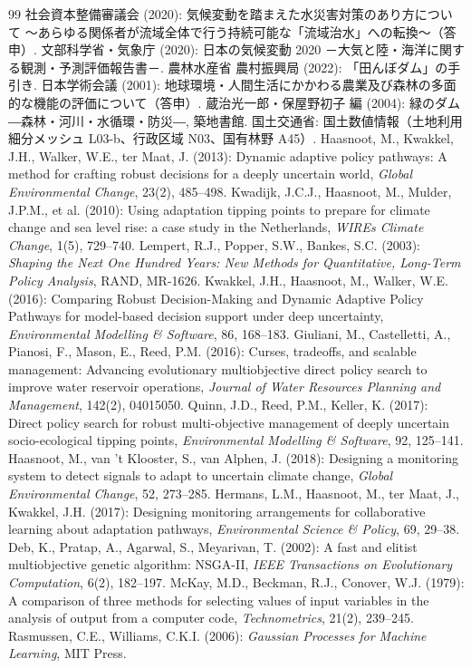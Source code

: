 \documentclass[a4paper,10pt]{ltjsarticle}
\begin{document}
\begin{thebibliography}{99}
 社会資本整備審議会 (2020): 気候変動を踏まえた水災害対策のあり方について ～あらゆる関係者が流域全体で行う持続可能な「流域治水」への転換～（答申）.
 文部科学省・気象庁 (2020): 日本の気候変動 2020 －大気と陸・海洋に関する観測・予測評価報告書－.
 農林水産省 農村振興局 (2022): 「田んぼダム」の手引き.
 日本学術会議 (2001): 地球環境・人間生活にかかわる農業及び森林の多面的な機能の評価について（答申）.
 蔵治光一郎・保屋野初子 編 (2004): 緑のダム ―森林・河川・水循環・防災―, 築地書館.
 国土交通省: 国土数値情報（土地利用細分メッシュ L03-b、行政区域 N03、国有林野 A45）.
 Haasnoot, M., Kwakkel, J.H., Walker, W.E., ter Maat, J. (2013): Dynamic adaptive policy pathways: A method for crafting robust decisions for a deeply uncertain world, \textit{Global Environmental Change}, 23(2), 485--498.
 Kwadijk, J.C.J., Haasnoot, M., Mulder, J.P.M., et al. (2010): Using adaptation tipping points to prepare for climate change and sea level rise: a case study in the Netherlands, \textit{WIREs Climate Change}, 1(5), 729--740.
 Lempert, R.J., Popper, S.W., Bankes, S.C. (2003): \textit{Shaping the Next One Hundred Years: New Methods for Quantitative, Long-Term Policy Analysis}, RAND, MR-1626.
 Kwakkel, J.H., Haasnoot, M., Walker, W.E. (2016): Comparing Robust Decision-Making and Dynamic Adaptive Policy Pathways for model-based decision support under deep uncertainty, \textit{Environmental Modelling \& Software}, 86, 168--183.
 Giuliani, M., Castelletti, A., Pianosi, F., Mason, E., Reed, P.M. (2016): Curses, tradeoffs, and scalable management: Advancing evolutionary multiobjective direct policy search to improve water reservoir operations, \textit{Journal of Water Resources Planning and Management}, 142(2), 04015050.
 Quinn, J.D., Reed, P.M., Keller, K. (2017): Direct policy search for robust multi-objective management of deeply uncertain socio-ecological tipping points, \textit{Environmental Modelling \& Software}, 92, 125--141.
 Haasnoot, M., van 't Klooster, S., van Alphen, J. (2018): Designing a monitoring system to detect signals to adapt to uncertain climate change, \textit{Global Environmental Change}, 52, 273--285.
 Hermans, L.M., Haasnoot, M., ter Maat, J., Kwakkel, J.H. (2017): Designing monitoring arrangements for collaborative learning about adaptation pathways, \textit{Environmental Science \& Policy}, 69, 29--38.
 Deb, K., Pratap, A., Agarwal, S., Meyarivan, T. (2002): A fast and elitist multiobjective genetic algorithm: NSGA-II, \textit{IEEE Transactions on Evolutionary Computation}, 6(2), 182--197.
 McKay, M.D., Beckman, R.J., Conover, W.J. (1979): A comparison of three methods for selecting values of input variables in the analysis of output from a computer code, \textit{Technometrics}, 21(2), 239--245.
 Rasmussen, C.E., Williams, C.K.I. (2006): \textit{Gaussian Processes for Machine Learning}, MIT Press.
\end{thebibliography}
\end{document}
